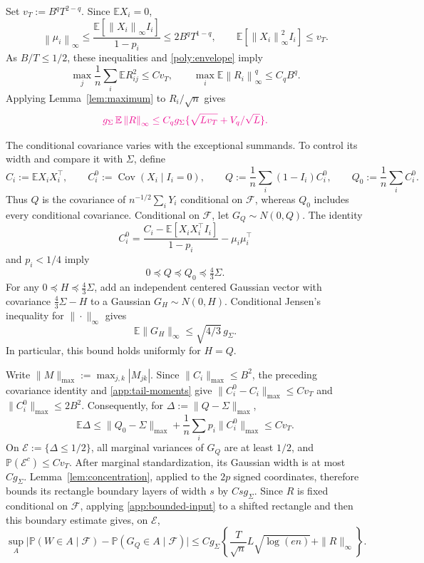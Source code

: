 \documentclass[11pt,letterpaper]{article}
\newcommand{\vSix}[1]{{\color{magenta}#1}}
\newenvironment{vSixBlock}{\color{magenta}}{}
\theoremstyle{remark}
\newcommand{\E}{\mathbb E}
\newcommand{\Pp}{\mathbb P}
\newcommand{\Cov}{\operatorname{Cov}}
\newcommand{\norm}[1]{\left\lVert#1\right\rVert}
\newcommand{\maxnorm}[1]{\lVert#1\rVert_{\max}}
\begin{document}
Set \(v_T:=B^qT^{2-q}\). Since \(\E X_i=0\),
\begin{equation}
 \norm{\mu_i}_\infty
 \le\frac{\E[\norm{X_i}_\infty I_i]}{1-p_i}
 \le2B^qT^{1-q},\qquad
 \E[\norm{X_i}_\infty^2 I_i]\le v_T.
 \label{app:tail-moments}
\end{equation}
{
As \(B/T\le1/2\), these inequalities and \eqref{poly:envelope} imply
}
\[
 \max_j\frac1n\sum_i\E R_{ij}^2\le C v_T,\qquad
 \max_i\E\norm{R_i}_\infty^q\le C_qB^q.
\]
Applying Lemma~\ref{lem:maximum} to \(R_i/\sqrt n\) gives
\begin{equation}
 \vSix{g_\Sigma\,\E\norm R_\infty
 \le C_qg_\Sigma\{\sqrt{Lv_T}+V_q/\sqrt L\}.}
 \label{app:shift}
\end{equation}

\begin{vSixBlock}
The conditional covariance varies with the exceptional summands.
To control its width and compare it with \(\Sigma\), define
\[
 C_i:=\E X_iX_i^\top,\qquad C_i^0:=\Cov(X_i\mid I_i=0),\qquad
 Q:=\frac1n\sum_i(1-I_i)C_i^0,\qquad Q_0:=\frac1n\sum_iC_i^0.
\]
Thus \(Q\) is the covariance of \(n^{-1/2}\sum_iY_i\) conditional
on \(\mathcal F\), whereas \(Q_0\) includes every conditional
covariance. Conditional on \(\mathcal F\), let \(G_Q\sim N(0,Q)\).
The identity
\[
 C_i^0=\frac{C_i-\E[X_iX_i^\top I_i]}{1-p_i}
                   -\mu_i\mu_i^\top
\]
and \(p_i<1/4\) imply
\begin{equation}
 0\preceq Q\preceq Q_0\preceq\tfrac43\Sigma.
 \label{app:conditional-width-order}
\end{equation}
For any \(0\preceq H\preceq\tfrac43\Sigma\), add an independent centered
Gaussian vector with covariance \(\tfrac43\Sigma-H\) to a
Gaussian \(G_H\sim N(0,H)\). Conditional Jensen's inequality for
\(\|\cdot\|_\infty\) gives
\[
 \E\|G_H\|_\infty\le\sqrt{4/3}\,g_\Sigma.
\]
In particular, this bound holds uniformly for \(H=Q\).

Write \(\maxnorm M:=\max_{j,k}|M_{jk}|\). Since
\(\maxnorm{C_i}\le B^2\), the preceding covariance identity and
\eqref{app:tail-moments} give
\(\maxnorm{C_i^0-C_i}\le Cv_T\) and
\(\maxnorm{C_i^0}\le2B^2\). Consequently, for
\(\Delta:=\maxnorm{Q-\Sigma}\),
\begin{equation}
 \E\Delta\le\maxnorm{Q_0-\Sigma}
             +\frac1n\sum_i p_i\maxnorm{C_i^0}\le Cv_T.
 \label{app:conditional-covariance}
\end{equation}
On \(\mathcal E:=\{\Delta\le1/2\}\), all marginal variances of
\(G_Q\) are at least \(1/2\), and
\(\Pp(\mathcal E^c)\le Cv_T\). After marginal standardization,
its Gaussian width is at most \(Cg_\Sigma\).
Lemma~\ref{lem:concentration}, applied to the \(2p\) signed
coordinates, therefore bounds its rectangle boundary layers of
width \(s\) by \(Csg_\Sigma\).
Since \(R\) is fixed conditional on \(\mathcal F\), applying
\eqref{app:bounded-input} to a shifted rectangle and then this
boundary estimate gives, on \(\mathcal E\),
\[
 \sup_A\bigl|\Pp(W\in A\mid\mathcal F)
             -\Pp(G_Q\in A\mid\mathcal F)\bigr|
 \le Cg_\Sigma\left\{
       \frac{T}{\sqrt n}L\sqrt{\log(en)}+\|R\|_\infty\right\}.
\]


\end{vSixBlock}
\end{document}
